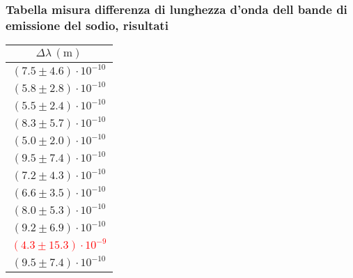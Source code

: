 \subsubsection{Tabella misura differenza di lunghezza d'onda dell bande di emissione del sodio, risultati}
    \begin{table}[H]
    \centering
        \begin{tabular}{|c|}
        \hline
        $ \Delta \lambda \, (\text{m}) $ \\
        \hline
        $(7{.}5 \pm 4{.}6) \cdot 10^{-10}$ \\
        \hline
        $(5{.}8 \pm 2{.}8) \cdot 10^{-10}$ \\
        \hline
        $(5{.}5 \pm 2{.}4) \cdot 10^{-10}$ \\
        \hline
        $(8{.}3 \pm 5{.}7) \cdot 10^{-10}$ \\
        \hline
        $(5{.}0 \pm 2{.}0) \cdot 10^{-10}$ \\
        \hline
        $(9{.}5 \pm 7{.}4) \cdot 10^{-10}$ \\
        \hline
        $(7{.}2 \pm 4{.}3) \cdot 10^{-10}$ \\
        \hline
        $(6{.}6 \pm 3{.}5) \cdot 10^{-10}$ \\
        \hline
        $(8{.}0 \pm 5{.}3) \cdot 10^{-10}$ \\
        \hline
        $(9{.}2 \pm 6{.}9) \cdot 10^{-10}$ \\
        \hline
        \textcolor{red}{$(4{.}3 \pm 15{.}3) \cdot 10^{-9}$} \\
        \hline
        $(9{.}5 \pm 7{.}4) \cdot 10^{-10}$ \\
        \hline
        \end{tabular}
    \end{table}